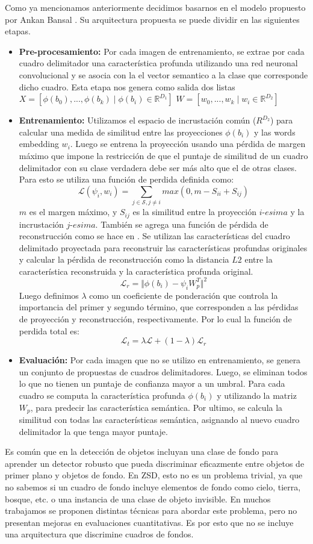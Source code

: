 Como ya mencionamos anteriormente decidimos basarnos en el modelo propuesto por Ankan Bansal \cite{bansal2018zero}. Su arquitectura propuesta se puede dividir en las siguientes etapas.
\begin{itemize}
	\item \textbf{Pre-procesamiento:} Por cada imagen de entrenamiento, se extrae por cada cuadro delimitador una característica profunda utilizando una red neuronal convolucional y se asocia con la el vector semantico a la clase que corresponde dicho cuadro. Esta etapa nos genera como salida dos listas $X = [\phi(b_0),...,\phi(b_k) \mid \phi(b_i) \in \mathbb{R}^{D_1}]$ $W = [w_0,...,w_k \mid w_i \in \mathbb{R}^{D_2}]$
	\item \textbf{Entrenamiento:} Utilizamos el espacio de incrustación común (${R}^{D_2}$) para calcular una medida de similitud entre las proyecciones  $\phi(b_i)$ y las words embedding  $w_i$. Luego se entrena la proyección usando una pérdida de margen máximo que impone la restricción de que el puntaje de similitud de un cuadro delimitador con su clase verdadera debe ser más alto que el de otras clases. Para esto se utiliza una función de perdida definida como: \[\mathcal{L}(\psi_i, w_i) = \sum_{j \in \mathcal{S}, j\neq i} max(0, m - S_{ii} + S_{ij})\] $m$ es el margen máximo, y $S_{ij}$ es la similitud entre la proyección $i$-$esima$ y la incrustación $j$-$esima$.  También se agrega una función de pérdida de reconstrucción como se hace en \cite{kodirov2017semantic}. Se utilizan las características del cuadro delimitado proyectada para reconstruir las características profundas originales y calcular la pérdida de reconstrucción como la distancia $L2$  entre la característica reconstruida y la característica profunda original. \[\mathcal{L}_r = \Vert{\phi(b_i) - \psi_iW_p^T}\Vert^2 \] Luego definimos $\lambda$ como un coeficiente de ponderación que controla la importancia del primer y segundo término, que corresponden a las pérdidas de proyección y reconstrucción, respectivamente. Por lo cual la función de perdida total es: \[\mathcal{L}_t = \lambda \mathcal{L} + (1-\lambda) \mathcal{L}_r \]
	\item \textbf{Evaluación:} Por cada imagen que no se utilizo en entrenamiento, se genera un conjunto de propuestas de cuadros delimitadores. Luego, se eliminan todos lo que no tienen un puntaje de confianza mayor a un umbral. Para cada cuadro se computa la característica profunda $\phi(b_i)$ y utilizando la matriz $W_p$, para predecir las característica semántica. Por ultimo, se calcula la similitud con todas las características semántica, asignando al nuevo cuadro delimitador la que tenga mayor puntaje.
\end{itemize}
Es común que en la detección de objetos incluyan una clase de fondo para aprender un detector robusto que pueda discriminar eficazmente entre objetos de primer plano y objetos de fondo. En ZSD, esto no es un problema trivial, ya que no sabemos si un cuadro de fondo incluye elementos de fondo como cielo, tierra, bosque, etc. o una instancia de una clase de objeto invisible. En muchos trabajamos se proponen distintas técnicas para abordar este problema, pero no presentan mejoras en evaluaciones cuantitativas. Es por esto que no se incluye una arquitectura que discrimine cuadros de fondos.

